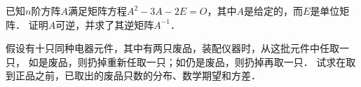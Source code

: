 \documentclass[plain,noanswer,medmath]{../../template/jnuexam}
\begin{document}
\begin{problem}
已知$n$阶方阵$A$满足矩阵方程$A^2 - 3A - 2E = O$，其中$A$是给定的，而$E$是单位矩阵．
证明$A$可逆，并求了其逆矩阵$A^{-1}$．
\end{problem}



%






\begin{problem}
假设有十只同种电器元件，其中有两只废品，装配仪器时，从这批元件中任取一只，
如是废品，则扔掉重新任取一只；如仍是废品，则扔掉再取一只．
试求在取到正品之前，已取出的废品只数的分布、数学期望和方差．
\end{problem}



\end{document}
